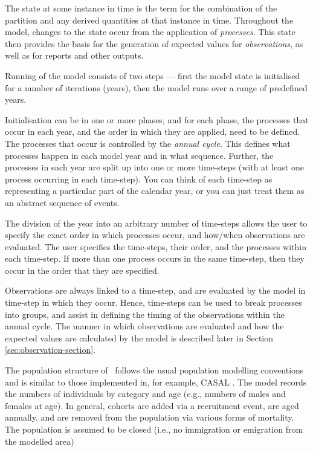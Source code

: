 The state at some instance in time is the term for the combination of the partition and any derived quantities at that instance in time. Throughout the model, changes to the state occur from the application of \emph{processes}. This state then provides the basis for the generation of expected values for \emph{observations}, as well as for reports and other outputs.

Running of the model consists of two steps --- first the model state is initialised for a number of iterations (years), then the model runs over a range of predefined years. 

Initialisation can be in one or more phases, and for each phase, the processes that occur in each year, and the order in which they are applied, need to be defined. The processes that occur is controlled by the \emph{annual cycle}. This defines what processes happen in each model year and in what sequence. Further, the processes in each year are split up into one or more time-steps (with at least one process occurring in each time-step). You can think of each time-step as representing a particular part of the calendar year, or you can just treat them as an abstract sequence of events.

The division of the year into an arbitrary number of time-steps allows the user to specify the exact order in which processes occur, and how/when observations are evaluated. The user specifies the time-steps, their order, and the processes within each time-step. If more than one process occurs in the same time-step, then they occur in the order that they are specified. 

Observations are always linked to a time-step, and are evaluated by the model in time-step in which they occur. Hence, time-steps can be used to break processes into groups, and assist in defining the timing of the observations within the annual cycle. The manner in which observations are evaluated and how the expected values are calculated by the model is described later in Section \ref{sec:observation-section}.

The population structure of \CNAME\ follows the usual population modelling conventions and is similar to those implemented in, for example, CASAL \citep{1388}. The model records the numbers of individuals by category and age (e.g., numbers of males and females at age). In general, cohorts are added via a recruitment event, are aged annually, and are removed from the population via various forms of mortality. The population is assumed to be closed (i.e., no immigration or emigration from the modelled area)

